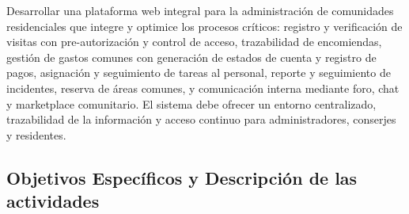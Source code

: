 Desarrollar una plataforma web integral para la administración de comunidades residenciales que integre y optimice los procesos críticos: registro y verificación de visitas con pre-autorización y control de acceso, trazabilidad de encomiendas, gestión de gastos comunes con generación de estados de cuenta y registro de pagos, asignación y seguimiento de tareas al personal, reporte y seguimiento de incidentes, reserva de áreas comunes, y comunicación interna mediante foro, chat y marketplace comunitario. El sistema debe ofrecer un entorno centralizado, trazabilidad de la información y acceso continuo para administradores, conserjes y residentes.


\subsection{Objetivos Específicos y Descripción de las actividades}

